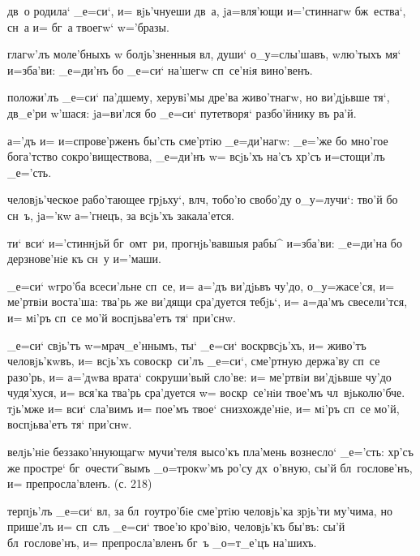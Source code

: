   дв~о родила` _е=си`, 
и= вjь'чнуеши дв~а, jа=вля'ющи и='стиннагw бж~ества`, 
сн~а и= бг~а твоегw` w='бразы.


  глагw'лъ моле'бныхъ w\т 
болjь'зненныя вл, души` о_у=слы'шавъ, w\т лю'тыхъ мя` 
и=зба'ви: _е=ди'нъ бо _е=си` на'шегw сп~се'нiя вино'венъ.

 положи'лъ _е=си` па'дшему, херувi'мы 
дре'ва живо'тнагw, но ви'дjьвше тя`, дв_е'ри 
w'шася: jа=ви'лся бо _е=си` путетворя` разбо'йнику 
въ ра'й.

 а='дъ и= и=спрове'рженъ бы'сть сме'ртiю 
_е=ди'нагw: _е='же бо мно'гое бога'тство 
сокро'виществова, _е=ди'нъ w= всjь'хъ на'съ хр'съ 
и=стощи'лъ _е='сть.


 человjь'ческое рабо'тающее грjьху`, 
вл ч, тобо'ю свобо'ду о_у=лучи`: тво'й бо сн~ъ, 
jа='кw а='гнецъ, за всjь'хъ закала'ется.

 ти` вси` и='стиннjьй бг~омт~ри, 
прогнjь'вавшыя рабы^ и=зба'ви: _е=ди'на бо дерзнове'нiе 
къ сн~у и='маши.

    _е=си` w\т гро'ба 
всеси'льне сп~се, и= а='дъ ви'дjьвъ чу'до, о_у=жасе'ся, 
и= ме'ртвiи воста'ша: тва'рь же ви'дящи сра'дуется 
тебjь`, и= а=да'мъ свесели'тся, и= мi'ръ сп~се мо'й 
воспjьва'етъ тя` при'снw.

  _е=си` свjь'тъ w=мрач_е'ннымъ, ты` 
_е=си` воскр всjь'хъ, и= живо'тъ человjь'кwвъ, и= 
всjь'хъ совоскр~си'лъ _е=си`, сме'ртную держа'ву сп~се 
разо'рь, и= а='дwва врата` сокруши'вый сло'ве: и= 
ме'ртвiи ви'дjьвше чу'до чудя'хуся, и= вся'ка тва'рь 
сра'дуется w= воскр~се'нiи твое'мъ чл~вjьколю'бче. 
тjь'мже и= вси` сла'вимъ и= пое'мъ твое` снизхожде'нiе, 
и= мi'ръ сп~се мо'й, воспjьва'етъ тя` при'снw.


  велjь'нiе 
беззако'ннующагw мучи'теля высо'къ пла'мень вознесло` 
_е='сть: хр'съ же простре` бг~очести^вымъ _о=трокw'мъ 
ро'су дх~о'вную, сы'й бл~гослове'нъ, и= препросла'вленъ. 
(с. 218)

 терпjь'лъ _е=си` вл, за бл~гоутро'бiе 
сме'ртiю человjь'ка зрjь'ти му'чима, но прише'лъ и= 
сп~слъ _е=си` твое'ю кро'вiю, человjь'къ бы'въ: сы'й 
бл~гослове'нъ, и= препросла'вленъ бг~ъ _о=т_е'цъ на'шихъ.

